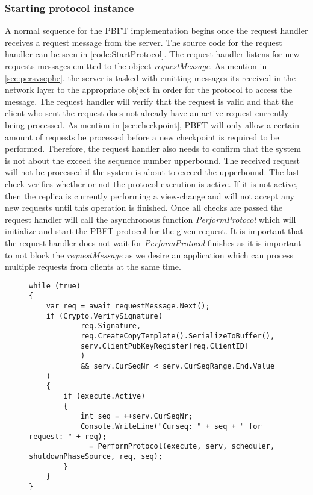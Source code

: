 \subsubsection{Starting protocol instance}
A normal sequence for the PBFT implementation begins once the request handler receives a request message from the server. The source code for the request handler can be seen in \autoref{code:StartProtocol}. The request handler listens for new requests messages emitted to the  object \emph{requestMessage}. As mention in \autoref{sec:persvsephe}, the server is tasked with emitting messages its received in the network layer to the appropriate  object in order for the protocol to access the message. The request handler will verify that the request is valid and that the client who sent the request does not already have an active request currently being processed. As mention in \autoref{sec:checkpoint}, PBFT will only allow a certain amount of requests be processed before a new checkpoint is required to be performed. Therefore, the request handler also needs to confirm that the system is not about the exceed the sequence number upperbound. The received request will not be processed if the system is about to exceed the upperbound. The last check verifies whether or not the protocol execution is active. If it is not active, then the replica is currently performing a view-change and will not accept any new requests until this operation is finished. Once all checks are passed the request handler will call the asynchronous  function \emph{PerformProtocol} which will initialize and start the PBFT protocol for the given request. It is important that the request handler does not wait for \emph{PerformProtocol} finishes as it is important to not block the \emph{requestMessage} as we desire an application which can process multiple requests from clients at the same time. 

\begin{figure}[H]
	\centering
	\begin{lstlisting}[label = code:StartProtocol, caption=Code section from the request handler, captionpos = b, basicstyle=\scriptsize]
while (true)
{
    var req = await requestMessage.Next();
    if (Crypto.VerifySignature(
        	req.Signature, 
            req.CreateCopyTemplate().SerializeToBuffer(), 
            serv.ClientPubKeyRegister[req.ClientID]
            ) 
            && serv.CurSeqNr < serv.CurSeqRange.End.Value
    )
    {
        if (execute.Active)
        {
            int seq = ++serv.CurSeqNr;
            Console.WriteLine("Curseq: " + seq + " for request: " + req);
            _ = PerformProtocol(execute, serv, scheduler, shutdownPhaseSource, req, seq);
        }
    }
}
	\end{lstlisting}
\end{figure}

